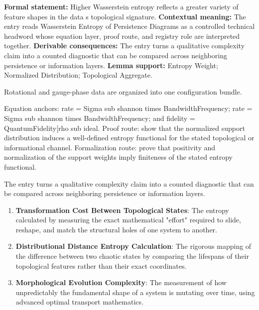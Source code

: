 \begingroup\footnotesize\setlength{\emergencystretch}{3em}\sloppy
\textbf{Formal statement:} Higher Wasserstein entropy reflects a greater variety of feature shapes in the data s topological signature. \textbf{Contextual meaning:} The entry reads Wasserstein Entropy of Persistence Diagrams as a controlled technical headword whose equation layer, proof route, and registry role are interpreted together. \textbf{Derivable consequences:} The entry turns a qualitative complexity claim into a counted diagnostic that can be compared across neighboring persistence or information layers. \textbf{Lemma support:} Entropy Weight; Normalized Distribution; Topological Aggregate.\par
\endgroup

Rotational and gauge-phase data are organized into one configuration bundle.

Equation anchors: rate = Sigma sub shannon times BandwidthFrequency; rate = Sigma sub shannon times BandwidthFrequency; and fidelity = QuantumFidelity[rho sub ideal. Proof route: show that the normalized support distribution induces a well-defined entropy functional for the stated topological or informational channel. Formalization route: prove that positivity and normalization of the support weights imply finiteness of the stated entropy functional.

The entry turns a qualitative complexity claim into a counted diagnostic that can be compared across neighboring persistence or information layers.
\endgroup

\begin{enumerate}[leftmargin=1.6em,itemsep=6pt,topsep=4pt]
\item \textbf{Transformation Cost Between Topological States}: The entropy calculated by measuring the exact mathematical "effort" required to slide, reshape, and match the structural holes of one system to another.
\item \textbf{Distributional Distance Entropy Calculation}: The rigorous mapping of the difference between two chaotic states by comparing the lifespans of their topological features rather than their exact coordinates.
\item \textbf{Morphological Evolution Complexity}: The measurement of how unpredictably the fundamental shape of a system is mutating over time, using advanced optimal transport mathematics.
\end{enumerate}

